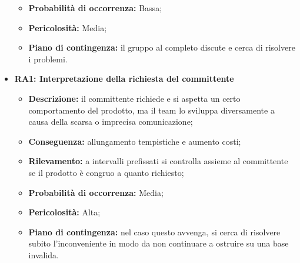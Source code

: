 \begin{itemize}
\begin{itemize}
		\item \textbf{Probabilità di occorrenza:} Bassa;
		\item \textbf{Pericolosità:} Media;
		\item \textbf{Piano di contingenza:} il gruppo al completo discute e cerca di risolvere i problemi.
	\end{itemize}
	\item \textbf{RA1: Interpretazione della richiesta del committente}
	\begin{itemize}
		\item \textbf{Descrizione:} il committente richiede e si aspetta un certo comportamento del prodotto, ma il team lo sviluppa diversamente a causa della scarsa o imprecisa comunicazione;
		\item \textbf{Conseguenza:} allungamento tempistiche e aumento costi; %
		\item \textbf{Rilevamento:} a intervalli prefissati si controlla assieme al committente se il prodotto è congruo a quanto richiesto;
		\item \textbf{Probabilità di occorrenza:} Media;
		\item \textbf{Pericolosità:} Alta;
		\item \textbf{Piano di contingenza:} nel caso questo avvenga, si cerca di risolvere subito l'inconveniente in modo da non continuare a ostruire su una base invalida.
	\end{itemize}
\end{itemize}